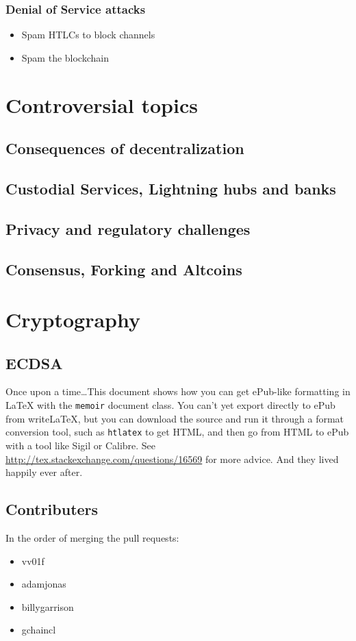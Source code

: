 \documentclass[ebook,12pt,oneside,openany]{memoir}
\begin{document}
\subsection{Denial of Service attacks}
\begin{itemize}
\item Spam HTLCs to block channels
\item Spam the blockchain
\end{itemize}
\chapter{Controversial topics}
\section{Consequences of decentralization}
\section{Custodial Services, Lightning hubs and banks}
\section{Privacy and regulatory challenges}
\section{Consensus, Forking and Altcoins}


\appendix
\chapter{Cryptography}
\section{ECDSA}

Once upon a time\ldots This document shows how you can get ePub-like formatting in \LaTeX{} with the \verb|memoir| document class. You can't yet export directly to ePub from writeLaTeX, but you can download the source and run it through a format conversion tool, such as \verb|htlatex| to get HTML, and then go from HTML to ePub with a tool like Sigil or Calibre. See \url{http://tex.stackexchange.com/questions/16569} for more advice. And they lived happily ever after.

\appendix
\section{Contributers}
In the order of merging the pull requests:
\begin{itemize}
\item vv01f
\item adamjonas
\item billygarrison
\item gchaincl
\end{itemize}
\end{document}
